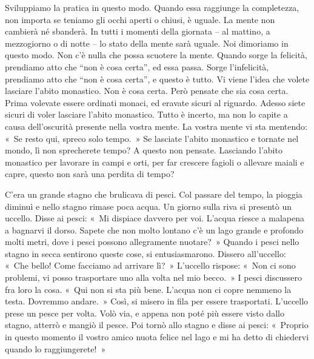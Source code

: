 Sviluppiamo la pratica in questo modo. Quando essa raggiunge la
completezza, non importa se teniamo gli occhi aperti o chiusi, è uguale.
La mente non cambierà né sbanderà. In tutti i momenti della giornata --
al mattino, a mezzogiorno o di notte -- lo stato della mente sarà
uguale. Noi dimoriamo in questo modo. Non c'è nulla che possa scuotere
la mente. Quando sorge la felicità, prendiamo atto che ``non è cosa
certa'', ed essa passa. Sorge l'infelicità, prendiamo atto che ``non è
cosa certa'', e questo è tutto. Vi viene l'idea che volete lasciare
l'abito monastico. Non è cosa certa. Però pensate che sia cosa certa.
Prima volevate essere ordinati monaci, ed eravate sicuri al riguardo.
Adesso siete sicuri di voler lasciare l'abito monastico. Tutto è
incerto, ma non lo capite a causa dell'oscurità presente nella vostra
mente. La vostra mente vi sta mentendo: «~Se resto qui, spreco solo
tempo.~» Se lasciate l'abito monastico e tornate nel mondo, lì non
sprecherete tempo? A questo non pensate. Lasciando l'abito monastico per
lavorare in campi e orti, per far crescere fagioli o allevare maiali e
capre, questo non sarà una perdita di tempo?

C'era un grande stagno che brulicava di pesci. Col passare del tempo, la
pioggia diminuì e nello stagno rimase poca acqua. Un giorno sulla riva
si presentò un uccello. Disse ai pesci: «~Mi dispiace davvero per voi.
L'acqua riesce a malapena a bagnarvi il dorso. Sapete che non molto
lontano c'è un lago grande e profondo molti metri, dove i pesci possono
allegramente nuotare?~» Quando i pesci nello stagno in secca sentirono
queste cose, si entusiasmarono. Dissero all'uccello: «~Che bello! Come
facciamo ad arrivare lì?~» L'uccello rispose: «~Non ci sono problemi, vi
posso trasportare uno alla volta nel mio becco.~» I pesci discussero fra
loro la cosa. «~Qui non si sta più bene. L'acqua non ci copre nemmeno la
testa. Dovremmo andare.~» Così, si misero in fila per essere
trasportati. L'uccello prese un pesce per volta. Volò via, e appena non
poté più essere visto dallo stagno, atterrò e mangiò il pesce. Poi tornò
allo stagno e disse ai pesci: «~Proprio in questo momento il vostro
amico nuota felice nel lago e mi ha detto di chiedervi quando lo
raggiungerete!~»

